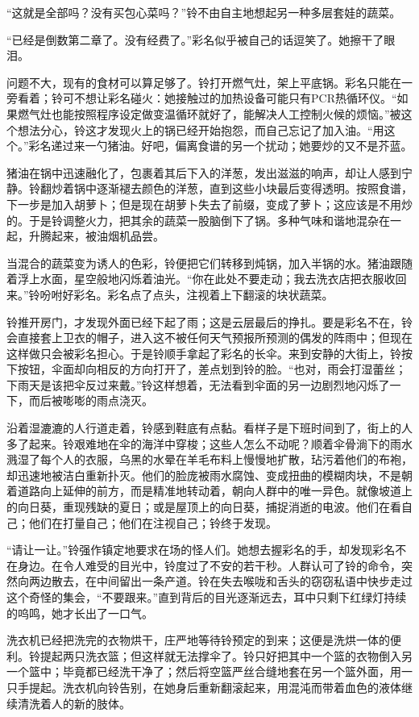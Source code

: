 “这就是全部吗？没有买包心菜吗？”铃不由自主地想起另一种多层套娃的蔬菜。

“已经是倒数第二章了。没有经费了。”彩名似乎被自己的话逗笑了。她擦干了眼泪。

问题不大，现有的食材可以算足够了。铃打开燃气灶，架上平底锅。彩名只能在一旁看着；铃可不想让彩名碰火：她接触过的加热设备可能只有PCR热循环仪。“如果燃气灶也能按照程序设定做变温循环就好了，能解决人工控制火候的烦恼。”被这个想法分心，铃这才发现火上的锅已经开始抱怨，而自己忘记了加入油。“用这个。”彩名递过来一勺猪油。好吧，偏离食谱的另一个扰动；她要炒的又不是芥蓝。

猪油在锅中迅速融化了，包裹着其后下入的洋葱，发出滋滋的响声，却让人感到宁静。铃翻炒着锅中逐渐褪去颜色的洋葱，直到这些小块最后变得透明。按照食谱，下一步是加入胡萝卜；但是现在胡萝卜失去了前缀，变成了萝卜；这应该是不用炒的。于是铃调整火力，把其余的蔬菜一股脑倒下了锅。多种气味和谐地混杂在一起，升腾起来，被油烟机品尝。

当混合的蔬菜变为诱人的色彩，铃便把它们转移到炖锅，加入半锅的水。猪油跟随着浮上水面，星空般地闪烁着油光。“你在此处不要走动；我去洗衣店把衣服收回来。”铃吩咐好彩名。彩名点了点头，注视着上下翻滚的块状蔬菜。

铃推开房门，才发现外面已经下起了雨；这是云层最后的挣扎。要是彩名不在，铃会直接套上卫衣的帽子，进入这不被任何天气预报所预测的偶发的阵雨中；但现在这样做只会被彩名担心。于是铃顺手拿起了彩名的长伞。来到安静的大街上，铃按下按钮，伞面却向相反的方向打开了，差点划到铃的脸。“也对，雨会打湿蕾丝；下雨天是该把伞反过来戴。”铃这样想着，无法看到伞面的另一边剧烈地闪烁了一下，而后被嘭嘭的雨点浇灭。

沿着湿漉漉的人行道走着，铃感到鞋底有点黏。看样子是下班时间到了，街上的人多了起来。铃艰难地在伞的海洋中穿梭；这些人怎么不动呢？顺着伞骨淌下的雨水溅湿了每个人的衣服，乌黑的水晕在羊毛布料上慢慢地扩散，玷污着他们的布袍，却迅速地被洁白重新扑灭。他们的脸庞被雨水腐蚀、变成扭曲的模糊肉块，不是朝着道路向上延伸的前方，而是精准地转动着，朝向人群中的唯一异色。就像坡道上的向日葵，重现残缺的夏日；或是屋顶上的向日葵，捕捉消逝的电波。他们在看自己；他们在打量自己；他们在注视自己；铃终于发现。

“请让一让。”铃强作镇定地要求在场的怪人们。她想去握彩名的手，却发现彩名不在身边。在令人难受的目光中，铃度过了不安的若干秒。人群认可了铃的命令，突然向两边散去，在中间留出一条产道。铃在失去喉咙和舌头的窃窃私语中快步走过这个奇怪的集会，“不要跟来。”直到背后的目光逐渐远去，耳中只剩下红绿灯持续的呜鸣，她才长出了一口气。

洗衣机已经把洗完的衣物烘干，庄严地等待铃预定的到来；这便是洗烘一体的便利。铃提起两只洗衣篮；但这样就无法撑伞了。铃只好把其中一个篮的衣物倒入另一个篮中；毕竟都已经洗干净了；然后将空篮严丝合缝地套在另一个篮外面，用一只手提起。洗衣机向铃告别，在她身后重新翻滚起来，用混沌而带着血色的液体继续清洗着人的新的肢体。

